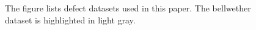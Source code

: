 \begin{figure}[!t]
\begin{minipage}{\linewidth}
{\begin{tabular}{l|r|r|r}
\end{tabular}%
}
\end{minipage}
\caption{The figure lists defect datasets used in this paper. The bellwether dataset is highlighted in \colorbox{lavenderpink}{light gray}.}
\label{fig:datasets}
\end{figure}